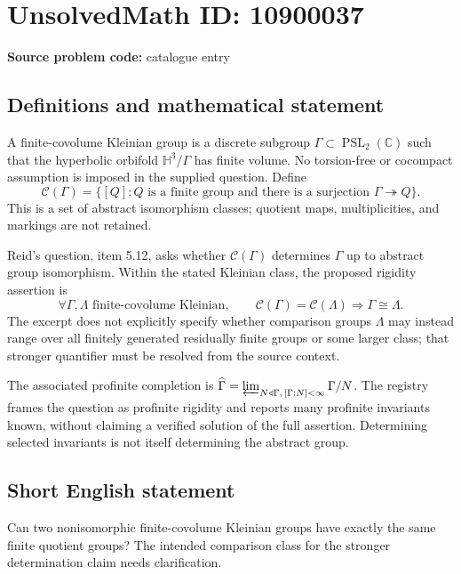 \documentclass[11pt]{article}
\newcommand{\C}{\mathbb{C}}
\begin{document}
\section*{UnsolvedMath ID: 10900037}
\textbf{Source problem code:} catalogue entry
\subsection{Definitions and mathematical statement}
A finite-covolume Kleinian group is a discrete subgroup $\Gamma\subset\operatorname{PSL}_2(\C)$ such that the hyperbolic orbifold $\mathbb H^3/\Gamma$ has finite volume. No torsion-free or cocompact assumption is imposed in the supplied question. Define
\[
 \mathcal C(\Gamma)=
 \{[Q]:Q\text{ is a finite group and there is a surjection }\Gamma\twoheadrightarrow Q\}.
\]
This is a set of abstract isomorphism classes; quotient maps, multiplicities, and markings are not retained.

Reid's question, item 5.12, asks whether $\mathcal C(\Gamma)$ determines $\Gamma$ up to abstract group isomorphism. Within the stated Kleinian class, the proposed rigidity assertion is
\[
 \forall\Gamma,\Lambda\text{ finite-covolume Kleinian},\qquad
 \mathcal C(\Gamma)=\mathcal C(\Lambda)\Longrightarrow\Gamma\cong\Lambda.
\]
The excerpt does not explicitly specify whether comparison groups $\Lambda$ may instead range over all finitely generated residually finite groups or some larger class; that stronger quantifier must be resolved from the source context.

The associated profinite completion is $\widehat\Gamma=\varprojlim_{N\triangleleft\Gamma,\,[\Gamma:N]<\infty}\Gamma/N$. The registry frames the question as profinite rigidity and reports many profinite invariants known, without claiming a verified solution of the full assertion. Determining selected invariants is not itself determining the abstract group.
\subsection{Short English statement}
Can two nonisomorphic finite-covolume Kleinian groups have exactly the same finite quotient groups? The intended comparison class for the stronger determination claim needs clarification.
\end{document}
